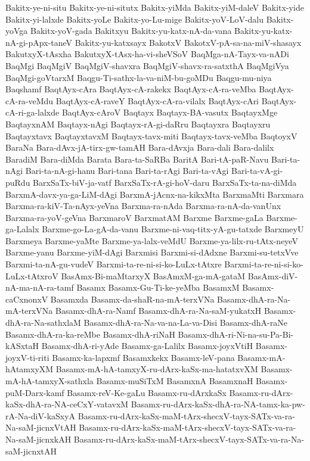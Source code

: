 {Bakitx-ye-ni-situ
Bakitx-ye-ni-situtx
Bakitx-yiMda
Bakitx-yiM-daleV
Bakitx-yide
Bakitx-yi-lalxde
Bakitx-yoLe
Bakitx-yo-Lu-mige
Bakitx-yoV-LoV-dalu
Bakitx-yoVga
Bakitx-yoV-gada
Bakitxyu
Bakitx-yu-katx-nA-da-vana
Bakitx-yu-katx-nA-gi-pApx-taneV
Bakitx-yu-katxsayx
BakotxV
BakotxV-pA-sa-na-miV-shasayx
BakutxyX-tAsxha
BakutxyX-tAsx-ha-vi-sheVSoV
BaqMga-nA-Tayx-va-nADi
BaqMgi
BaqMgiV
BaqMgiV-shavxra
BaqMgiV-shavx-ra-satxthA
BaqMgiVya
BaqMgi-goVtarxM
Baqgu-Ti-sathx-la-va-niM-bu-goMDu
Baqgu-mu-niya
Baqshamf
BaqtAyx-cAra
BaqtAyx-cA-rakekx
BaqtAyx-cA-ra-veMba
BaqtAyx-cA-ra-veMdu
BaqtAyx-cA-raveY
BaqtAyx-cA-ra-vilalx
BaqtAyx-cAri
BaqtAyx-cA-ri-ga-lalxde
BaqtAyx-cAroV
Baqtayx
Baqtayx-BA-vasutx
BaqtayxMge
BaqtayxnAM
Baqtayx-nAgi
Baqtayx-rA-gi-daRru
Baqtayxra
Baqtayxru
Baqtayxtavx
BaqtayxtavxM
Baqtayx-tavx-miti
Baqtayx-tavx-veMba
BaqtoyxV
BaraNa
Bara-dAvx-jA-tirx-gw-tamAH
Bara-dAvxja
Bara-dali
Bara-dalilx
BaradiM
Bara-diMda
Barata
Bara-ta-SaRBa
BaritA
Bari-tA-paR-Navu
Bari-ta-nAgi
Bari-ta-nA-gi-hanu
Bari-tana
Bari-ta-rAgi
Bari-ta-vAgi
Bari-ta-vA-gi-puRdu
BarxSaTx-biV-ja-vatf
BarxSaTx-rA-gi-hoV-daru
BarxSaTx-ta-na-diMda
BarxmA-davx-ya-ga-LiM-dAgi
BarxmA-jAcnx-na-kikxMta
BarxmaMti
Barxmara
Barxma-ra-kiV-Ta-nAyx-yeVna
Barxma-ra-nAda
Barxma-ra-nA-da-vanUnx
Barxma-ra-yoV-geVna
BarxmaroV
BarxmatAM
Barxme
Barxme-gaLa
Barxme-ga-Lalalx
Barxme-go-La-gA-da-vanu
Barxme-ni-vaq-titx-yA-gu-tatxde
BarxmeyU
Barxmeya
Barxme-yaMte
Barxme-ya-lalx-veMdU
Barxme-ya-lilx-ru-tAtx-neyeV
Barxme-yanu
Barxme-yiM-dAgi
Barxmisi
Barxmi-si-dAdxne
Barxmi-su-tetxVve
Barxmi-ta-nA-gu-vudeV
Barxmi-ta-re-ni-si-ko-LuLx-tAtxre
Barxmi-ta-re-ni-si-ko-LuLx-tAtxroV
BasAmx-Bi-maMtarxyX
BasAmxM-ga-mA-gataM
BasAmx-diV-nA-ma-nA-ra-tamf
Basamx
Basamx-Gu-Ti-ke-yeMba
BasamxM
Basamx-caCxnonxV
Basamxda
Basamx-da-shaR-na-mA-terxVNa
Basamx-dhA-ra-Na-mA-terxVNa
Basamx-dhA-ra-Namf
Basamx-dhA-ra-Na-saM-yukatxH
Basamx-dhA-ra-Na-sathxlaM
Basamx-dhA-ra-Na-va-na-La-va-Disi
Basamx-dhA-raNe
Basamx-dhA-ra-ka-reMbe
Basamx-dhA-riNaH
Basamx-dhA-ri-Ni-na-su-Pa-Bi-kASxtaH
Basamx-dhA-ri-yAde
Basamx-ga-Lalilx
Basamx-joyxVtiH
Basamx-joyxV-ti-riti
Basamx-ka-lapxmf
Basamxkekx
Basamx-leV-pana
Basamx-mA-hAtamxyXM
Basamx-mA-hA-tamxyX-ru-dArx-kaSx-ma-hatatxvXM
Basamx-mA-hA-tamxyX-sathxla
Basamx-muSiTxM
BasamxnA
BasamxnaH
Basamx-puM-Darx-kamf
Basamx-reV-Ke-gaLu
Basamx-ru-dArxkaSx
Basamx-ru-dArx-kaSx-dhA-ra-NA-ceCxY-vatavxM
Basamx-ru-dArx-kaSx-dhA-ra-NA-tamx-ka-pw-rA-Na-diV-kaSxyA
Basamx-ru-dArx-kaSx-maM-tArx-shecxV-tayx-SATx-va-ra-Na-saM-jicnxVtAH
Basamx-ru-dArx-kaSx-maM-tArx-shecxV-tayx-SATx-va-ra-Na-saM-jicnxkAH
Basamx-ru-dArx-kaSx-maM-tArx-shecxV-tayx-SATx-va-ra-Na-saM-jicnxtAH
}
